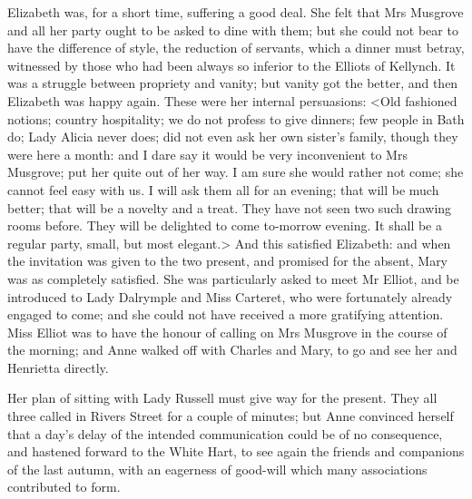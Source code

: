 Elizabeth was, for a short time, suffering a good deal. She felt that Mrs Musgrove and all her party ought to be asked to dine with them; but she could not bear to have the difference of style, the reduction of servants, which a dinner must betray, witnessed by those who had been always so inferior to the Elliots of Kellynch. It was a struggle between propriety and vanity; but vanity got the better, and then Elizabeth was happy again. These were her internal persuasions: <Old fashioned notions; country hospitality; we do not profess to give dinners; few people in Bath do; Lady Alicia never does; did not even ask her own sister's family, though they were here a month: and I dare say it would be very inconvenient to Mrs Musgrove; put her quite out of her way. I am sure she would rather not come; she cannot feel easy with us. I will ask them all for an evening; that will be much better; that will be a novelty and a treat. They have not seen two such drawing rooms before. They will be delighted to come to-morrow evening. It shall be a regular party, small, but most elegant.> And this satisfied Elizabeth: and when the invitation was given to the two present, and promised for the absent, Mary was as completely satisfied. She was particularly asked to meet Mr Elliot, and be introduced to Lady Dalrymple and Miss Carteret, who were fortunately already engaged to come; and she could not have received a more gratifying attention. Miss Elliot was to have the honour of calling on Mrs Musgrove in the course of the morning; and Anne walked off with Charles and Mary, to go and see her and Henrietta directly.

Her plan of sitting with Lady Russell must give way for the present. They all three called in Rivers Street for a couple of minutes; but Anne convinced herself that a day's delay of the intended communication could be of no consequence, and hastened forward to the White Hart, to see again the friends and companions of the last autumn, with an eagerness of good-will which many associations contributed to form.

